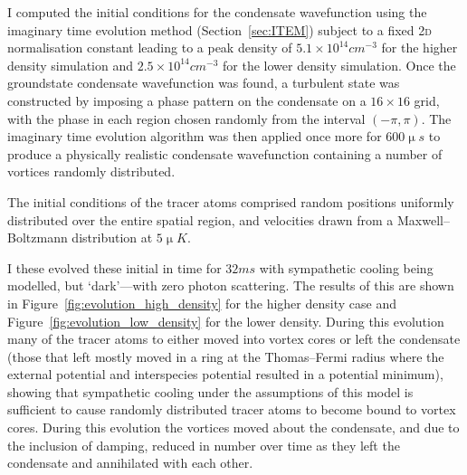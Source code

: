 I computed the initial conditions for the condensate wavefunction using the imaginary time evolution method (Section~\ref{sec:ITEM}) subject to a fixed \textsc{2d} normalisation constant leading to a peak density of $5.1\times 10^{14}\unit{cm}^{-3}$ for the higher density simulation and $2.5\times 10^{14}\unit{cm}^{-3}$ for the lower density simulation. Once the groundstate condensate wavefunction was found, a turbulent state was constructed by imposing a phase pattern on the condensate on a $16\times16$ grid, with the phase in each region chosen randomly from the interval $(-\pi, \pi)$. The imaginary time evolution algorithm was then applied once more for $600\unit{\upmu s}$ to produce a physically realistic condensate wavefunction containing a number of vortices randomly distributed.

The initial conditions of the tracer atoms comprised random positions uniformly distributed over the entire spatial region, and velocities drawn from a Maxwell--Boltzmann distribution at $5\unit{\upmu K}$.

I these evolved these initial in time for $32\unit{ms}$ with sympathetic cooling being modelled, but `dark'---with zero photon scattering. The results of this are shown in Figure~\ref{fig:evolution_high_density} for the higher density case and Figure~\ref{fig:evolution_low_density} for the lower density. During this evolution many of the tracer atoms to either moved into vortex cores or left the condensate (those that left mostly moved in a ring at the Thomas--Fermi radius where the external potential and interspecies potential resulted in a potential minimum), showing that sympathetic cooling under the assumptions of this model is sufficient to cause randomly distributed tracer atoms to become bound to vortex cores. During this evolution the vortices moved about the condensate, and due to the inclusion of damping, reduced in number over time as they left the condensate and annihilated with each other.

